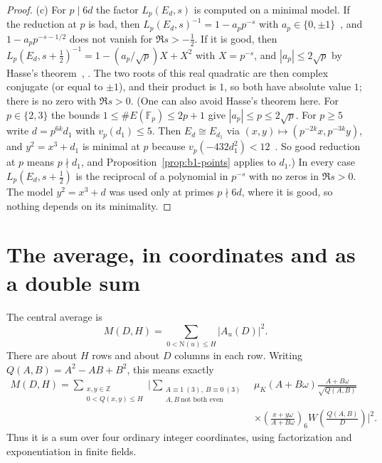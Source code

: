 \documentclass[11pt]{article}
\numberwithin{equation}{section}
\newcommand{\N}{\mathrm N}
\newcommand{\muk}{\mu_K}
\begin{document}
\begin{proof}
(c) For $p\mid6d$ the factor $L_p(E_d,s)$ is computed on a minimal model. If the reduction at $p$ is bad, then
$L_p(E_d,s)^{-1}=1-a_pp^{-s}$ with $a_p\in\{0,\pm1\}$~\cite[Appendix~C, \S16]{SilAEC}, and $1-a_pp^{-s-1/2}$ does not
vanish for $\Re s>-\frac12$. If it is good, then $L_p(E_d,s+\frac12)^{-1}=1-(a_p/\sqrt p)X+X^2$ with $X=p^{-s}$, and
$|a_p|\le2\sqrt p$ by Hasse's theorem~\cite{Has36}, \cite[Theorem~V.1.1]{SilAEC}. The two roots of this real quadratic are then
complex conjugate (or equal to $\pm1$), and their product is $1$, so both have absolute value $1$; there is no zero
with $\Re s>0$. (One can also avoid Hasse's theorem here. For $p\in\{2,3\}$ the bounds
$1\le\#E(\mathbb F_p)\le2p+1$ give $|a_p|\le p\le2\sqrt p$. For $p\ge5$ write $d=p^{6k}d_1$ with $v_p(d_1)\le5$. Then
$E_d\cong E_{d_1}$ via $(x,y)\mapsto(p^{-2k}x,p^{-3k}y)$, and $y^2=x^3+d_1$ is minimal at $p$ because
$v_p(-432d_1^2)<12$~\cite[Remark~VII.1.1]{SilAEC}. So good reduction at $p$ means $p\nmid d_1$, and
Proposition~\ref{prop:b1-points} applies to $d_1$.) In every case $L_p(E_d,s+\frac12)$ is the
reciprocal of a polynomial in $p^{-s}$ with no zeros in $\Re s>0$. The model $y^2=x^3+d$ was used only at primes
$p\nmid6d$, where it is good, so nothing depends on its minimality.
\end{proof}

\section{The average, in coordinates and as a double sum}\label{sec:average}

The central average is
\begin{equation}\label{eq:M}
 M(D,H)=\sum_{0<\N(u)\le H}|A_u(D)|^2.
\end{equation}
There are about $H$ rows and about $D$ columns in each row.
Writing $Q(A,B)=A^2-AB+B^2$, this means exactly
\begin{equation}\label{eq:coordinates}
\begin{split}
 M(D,H)=\sum_{\substack{x,y\in\mathbb Z\\0<Q(x,y)\le H}}
 \Bigg|\sum_{\substack{A\equiv1\ (3),\ B\equiv0\ (3)\\
                          A,B\ \text{not both even}}}
 &\muk(A+B\omega)\frac{A+B\omega}{\sqrt{Q(A,B)}}\\[-1ex]
 &\times\left(\frac{x+y\omega}{A+B\omega}\right)_6
 W\left(\frac{Q(A,B)}D\right)\Bigg|^2.
\end{split}
\end{equation}
Thus it is a sum over four ordinary integer coordinates, using
factorization and exponentiation in finite fields.
\end{document}
